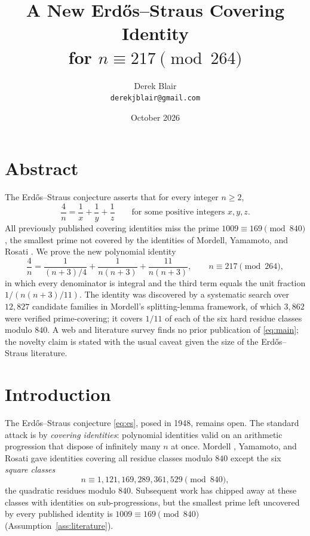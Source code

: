 \documentclass[11pt,a4paper]{article}
\title{A New Erd\H{o}s--Straus Covering Identity\\ for $n \equiv 217 \pmod{264}$}
\author{Derek Blair \\ \texttt{derekjblair@gmail.com}}
\date{October 2026}
\theoremstyle{definition}
\begin{document}
\maketitle

\section{Abstract}

The Erd\H{o}s--Straus conjecture asserts that for every integer $n \geq 2$,
\begin{equation}
  \label{eq:es}
  \frac{4}{n} = \frac{1}{x} + \frac{1}{y} + \frac{1}{z}
  \qquad\text{for some positive integers } x, y, z.
\end{equation}
All previously published covering identities miss the prime $1009 \equiv 169
\pmod{840}$, the smallest prime not covered by the identities of Mordell,
Yamamoto, and Rosati \cite{wiki-es,opentorus2026}. We prove the new
polynomial identity
\begin{equation}
  \label{eq:main}
  \frac{4}{n} = \frac{1}{(n+3)/4} + \frac{1}{n(n+3)}
               + \frac{11}{n(n+3)},
  \qquad n \equiv 217 \pmod{264},
\end{equation}
in which every denominator is integral and the third term equals the unit
fraction $1/(n(n+3)/11)$. The identity was discovered by a systematic search
over $12{,}827$ candidate families in Mordell's splitting-lemma framework,
of which $3{,}862$ were verified prime-covering; it covers $1/11$ of each
of the six hard residue classes modulo $840$. A web and literature survey
finds no prior publication of \eqref{eq:main}; the novelty claim is stated
with the usual caveat given the size of the Erd\H{o}s--Straus literature.

\section{Introduction}

The Erd\H{o}s--Straus conjecture \eqref{eq:es}, posed in 1948, remains open.
The standard attack is by \emph{covering identities}: polynomial identities
valid on an arithmetic progression that dispose of infinitely many $n$ at
once. Mordell \cite{mordell1967}, Yamamoto, and Rosati gave identities
covering all residue classes modulo $840$ except the six \emph{square
classes}
\begin{equation}
  \label{eq:squareclasses}
  n \equiv 1, 121, 169, 289, 361, 529 \pmod{840},
\end{equation}
the quadratic residues modulo $840$. Subsequent work has chipped away at
these classes with identities on sub-progressions, but the smallest prime
left uncovered by every published identity is $1009 \equiv 169 \pmod{840}$
\cite{wiki-es,opentorus2026} (Assumption~\ref{ass:literature}).
\end{document}

